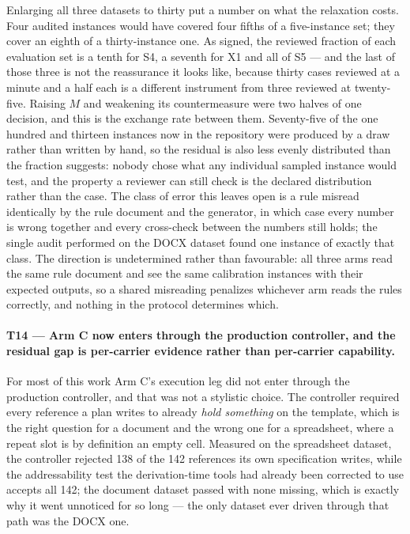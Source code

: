 Enlarging all three datasets to thirty put a number on what the relaxation costs. Four
audited instances would have covered four fifths of a five-instance set; they cover an eighth
of a thirty-instance one. As signed, the reviewed fraction of each evaluation set is a tenth
for S4, a seventh for X1 and all of S5 --- and the last of those three is not the reassurance
it looks like, because thirty cases reviewed at a minute and a half each is a different
instrument from three reviewed at twenty-five. Raising $M$ and weakening its countermeasure were two halves of one
decision, and this is the exchange rate between them. Seventy-five of the one hundred and
thirteen instances now in the repository were produced by a draw rather than written by hand,
so the residual is also less evenly distributed than the fraction suggests: nobody chose what
any individual sampled instance would test, and the property a reviewer can still check is
the declared distribution rather than the case. The
class of error this leaves open is a rule misread identically by the rule document and the
generator, in which case every number is wrong together and every cross-check between the
numbers still holds; the single audit performed on the DOCX dataset found one instance of
exactly that class. The direction is undetermined rather than favourable: all three arms read
the same rule document and see the same calibration instances with their expected outputs, so
a shared misreading penalizes whichever arm reads the rules correctly, and nothing in the
protocol determines which.

\paragraph{T14 --- Arm C now enters through the production controller, and the residual gap is
per-carrier evidence rather than per-carrier capability.}
For most of this work Arm C's execution leg did not enter through the production controller,
and that was not a stylistic choice. The controller required every reference a plan writes to
already \emph{hold something} on the template, which is the right question for a document and
the wrong one for a spreadsheet, where a repeat slot is by definition an empty cell. Measured on
the spreadsheet dataset, the controller rejected 138 of the 142 references its own specification
writes, while the addressability test the derivation-time tools had already been corrected to
use accepts all 142; the document dataset passed with none missing, which is exactly why it went
unnoticed for so long --- the only dataset ever driven through that path was the DOCX one.

